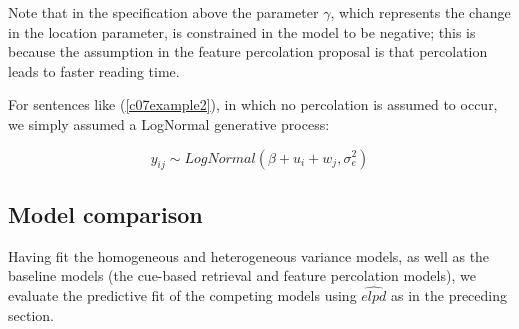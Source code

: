 \documentclass{cambridge7A}\usepackage[]{graphicx}\usepackage[]{color}
\begin{document}
\noindent
Note that in the specification above the parameter $\gamma$, which represents the change in the location parameter, is constrained in the model to be negative; this is because the assumption in the feature percolation proposal is that percolation leads to faster reading time.

For sentences like (\ref{c07example2}), in which no percolation is assumed to occur, we simply assumed a LogNormal generative process:

\begin{equation}
y_{ij} \sim LogNormal(\beta+u_i+w_j,\sigma_{e}^2)
\end{equation}

\subsection{Model comparison}
Having fit the homogeneous and heterogeneous variance models, as well as the baseline models (the cue-based retrieval and feature percolation models), we evaluate the predictive fit of the competing models using $\widehat{elpd}$ as in the preceding section.
\end{document}
